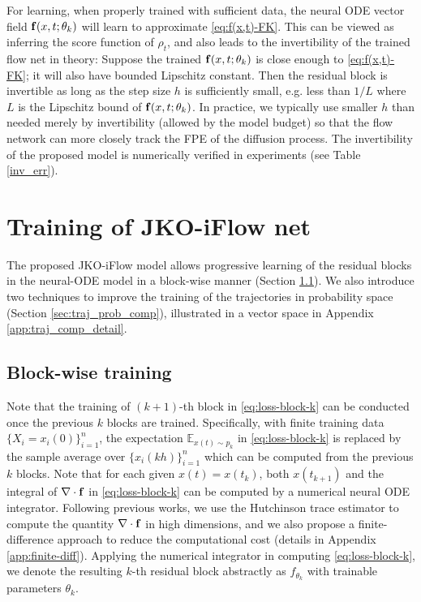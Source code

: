\documentclass{article}
\theoremstyle{remark}
\theoremstyle{plain}
\newcommand{\JKO}{JKO-iFlow}
\newcommand{\E}{\mathbb{E}}
\begin{document}
{For learning, when properly trained with sufficient data, the neural ODE vector field ${\bf f}(x,t; \theta_k )$ will learn to approximate \eqref{eq:f(x,t)-FK}.
This can be viewed as inferring the score function of $\rho_t$, and also leads to the invertibility of the trained flow net in theory:
Suppose the trained ${\bf f}(x,t; \theta_k )$ is close enough to \eqref{eq:f(x,t)-FK}; it will also have bounded Lipschitz constant. Then the residual block is invertible as long as the step size $h$ is sufficiently small, e.g. less than $1/L$ where $L$ is the Lipschitz bound of ${\bf f}(x,t; \theta_k )$. In practice, we typically use smaller $h$ than needed merely by invertibility (allowed by the model budget) so that the flow network can more closely track the FPE of the diffusion process. The invertibility of the proposed model is numerically verified in experiments (see Table \ref{inv_err}).







\section{Training of \JKO{} net}\label{sec:algo}

The proposed \JKO{} model allows progressive  learning of the residual blocks in the neural-ODE model in a block-wise manner (Section \ref{sec:layer_wise}).
We also introduce two techniques to improve the training of the trajectories in probability space (Section \ref{sec:traj_prob_comp}),
illustrated in a vector space in Appendix \ref{app:traj_comp_detail}.
  
 
\subsection{Block-wise training}\label{sec:layer_wise}


Note that the training of $(k+1)$-th block in \eqref{eq:loss-block-k} can be conducted once the previous $k$ blocks are trained. 
Specifically, with finite training data $\{ X_i = x_i(0) \}_{i=1}^n$, the expectation $\E_{x(t) \sim p_k} $ in \eqref{eq:loss-block-k} is replaced by the sample average over $\{ x_i( kh ) \}_{i=1}^n$ which can be computed from the previous $k$ blocks.
Note that for each given $x(t) = x(t_k)$,
both $x(t_{k+1}) $ and the integral of $\nabla \cdot {\bf f}$ in \eqref{eq:loss-block-k} can be computed by 
a numerical neural ODE integrator.
Following previous works, we use the Hutchinson trace estimator \citep{Hutchinson1989ASE,FFJORD} to compute the quantity $\nabla \cdot {\bf f}$ in high dimensions, and we also propose a finite-difference approach to reduce the computational cost (details in Appendix \ref{app:finite-diff}).
Applying the numerical integrator in computing \eqref{eq:loss-block-k}, 
we denote the resulting $k$-th residual block abstractly as $f_{\theta_k}$ with trainable parameters $\theta_k$.



}
\end{document}
